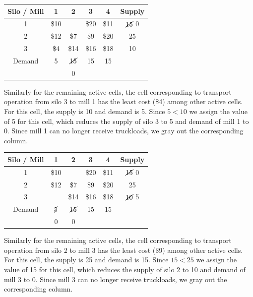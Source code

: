 \begin{center}
	\begin{tabular}{c | c | c | c | c | c}
		Silo / Mill & 1 & 2 & 3 & 4 & \textbf{Supply}\\ 
		\hline
		1 & \$10 \cellcolor[gray]{0.8} & \innerbox{\$2}{15} \cellcolor[gray]{0.8} & \$20 \cellcolor[gray]{0.8} & \$11 \cellcolor[gray]{0.8} & $ \cancel{15} $ 0\\
		\hline
		2 & \$12 & \$7 \cellcolor[gray]{0.8} & \$9 & \$20 & 25\\
		\hline
		3 & \$4 & \$14 \cellcolor[gray]{0.8} & \$16 & \$18 & 10\\
		\hline
		Demand & 5 & $ \cancel{15} $ & 15 & 15 & \\
		&  & 0 & & & 
	\end{tabular}
\end{center}
Similarly for the remaining active cells, the cell corresponding to transport operation from silo 3 to mill 1 has the least cost (\$4) among other active cells. For this cell, the supply is 10 and demand is 5. Since $ 5 < 10 $ we assign the value of 5 for this cell, which reduces the supply of silo 3 to 5 and demand of mill 1 to 0. Since mill 1 can no longer receive truckloads, we gray out the corresponding column.
\begin{center}
	\begin{tabular}{c | c | c | c | c | c}
		Silo / Mill & 1 & 2 & 3 & 4 & \textbf{Supply}\\ 
		\hline
		1 & \$10 \cellcolor[gray]{0.8} & \innerbox{\$2}{15} \cellcolor[gray]{0.8} & \$20 \cellcolor[gray]{0.8} & \$11 \cellcolor[gray]{0.8} & $ \cancel{15} $ 0\\
		\hline
		2 & \$12 \cellcolor[gray]{0.8} & \$7 \cellcolor[gray]{0.8} & \$9 & \$20 & 25\\
		\hline
		3 & \innerbox{\$4}{5} \cellcolor[gray]{0.8} & \$14 \cellcolor[gray]{0.8} & \$16 & \$18 & $ \cancel{10} $ 5\\
		\hline
		Demand & $ \cancel{5} $ & $ \cancel{15} $ & 15 & 15 & \\
		& 0 & 0 & & & 
	\end{tabular}
\end{center}
Similarly for the remaining active cells, the cell corresponding to transport operation from silo 2 to mill 3 has the least cost (\$9) among other active cells. For this cell, the supply is 25 and demand is 15. Since $ 15 < 25 $ we assign the value of 15 for this cell, which reduces the supply of silo 2 to 10 and demand of mill 3 to 0. Since mill 3 can no longer receive truckloads, we gray out the corresponding column.
